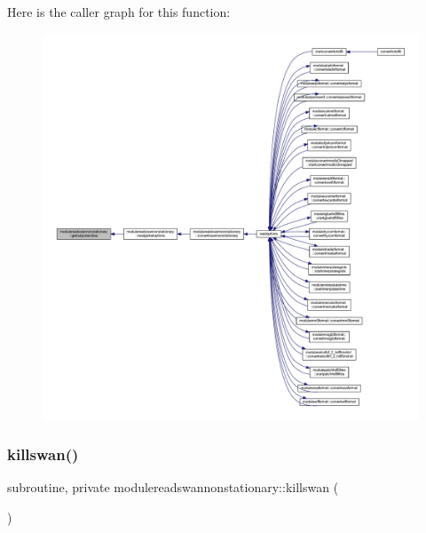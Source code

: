 Here is the caller graph for this function\+:\nopagebreak
\begin{figure}[H]
\begin{center}
\leavevmode
\includegraphics[width=350pt]{namespacemodulereadswannonstationary_a7fdb18d8cbff6e60af51a911dbea6813_icgraph}
\end{center}
\end{figure}
\mbox{\label{namespacemodulereadswannonstationary_a568ac2906250752e8eb67fb713cc4212}} 
\subsubsection{\texorpdfstring{killswan()}{killswan()}}
{\footnotesize\ttfamily subroutine, private modulereadswannonstationary\+::killswan (\begin{DoxyParamCaption}{ }\end{DoxyParamCaption})\hspace{0.3cm}{\ttfamily [private]}}

